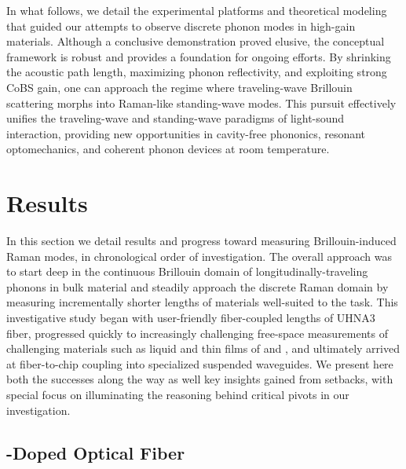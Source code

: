 In what follows, we detail the experimental platforms and theoretical modeling that guided our attempts to observe discrete phonon modes in high-gain materials. Although a conclusive demonstration proved elusive, the conceptual framework is robust and provides a foundation for ongoing efforts. By shrinking the acoustic path length, maximizing phonon reflectivity, and exploiting strong \ac{CoBS} gain, one can approach the regime where traveling-wave Brillouin scattering morphs into Raman-like standing-wave modes. This pursuit effectively unifies the traveling-wave and standing-wave paradigms of light-sound interaction, providing new opportunities in cavity-free phononics, resonant optomechanics, and coherent phonon devices at room temperature.


\section{Results}
\label{sec:Raman:Results}

In this section we detail results and progress toward measuring Brillouin-induced Raman modes, in chronological order of investigation. The overall approach was to start deep in the continuous Brillouin domain of longitudinally-traveling phonons in bulk material and steadily approach the discrete Raman domain by measuring incrementally shorter lengths of materials well-suited to the task. This investigative study began with user-friendly fiber-coupled lengths of \ac{UHNA3} fiber, progressed quickly to increasingly challenging free-space measurements of challenging materials such as liquid  and thin films of  and , and ultimately arrived at fiber-to-chip coupling into specialized suspended waveguides. We present here both the successes along the way as well key insights gained from setbacks, with special focus on illuminating the reasoning behind critical pivots in our investigation.

\subsection{-Doped Optical Fiber}
\label{subsec:Raman:Target:UHNA3}

